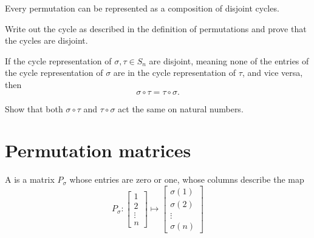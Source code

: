 \documentclass{ximera}
\begin{document}
\begin{lemma}\label{L:CC}
  Every permutation can be represented as a composition of disjoint
  cycles.
  \begin{sketch}
    Write out the cycle as described in the definition of permutations
    and prove that the cycles are disjoint.
  \end{sketch}
\end{lemma}

\begin{lemma}
  If the cycle representation of $\sigma,\tau\in S_n$ are disjoint,
  meaning none of the entries of the cycle representation of $\sigma$
  are in the cycle representation of $\tau$, and vice versa, then
  \[
  \sigma \circ \tau = \tau \circ \sigma.
  \]
  \begin{sketch}
    Show that both $\sigma \circ \tau$ and $\tau \circ \sigma$ act the
    same on natural numbers.
  \end{sketch} 
\end{lemma}



\section{Permutation matrices}

\begin{definition}
  A  is a matrix $P_\sigma$ whose entries are
  zero or one, whose columns describe the map
  \[
  P_\sigma : \begin{bmatrix}
    1 \\
    2 \\
    \vdots \\
    n
  \end{bmatrix}
  \mapsto
  \begin{bmatrix}
    \sigma(1) \\
    \sigma(2) \\
    \vdots \\
    \sigma(n)
  \end{bmatrix}
  \]
\end{definition}
\end{document}
